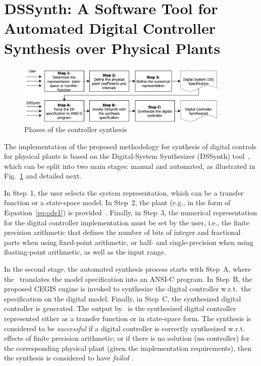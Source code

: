 \fi

\section{DSSynth: A Software Tool for Automated Digital Controller Synthesis over Physical Plants}
\label{sec:dssynthtool}

\begin{figure}[t]
\centering
\includegraphics[width=0.9\textwidth]{figures/synthesis-flow.pdf}
\caption{Phases of the controller synthesis}
\label{fig:synthesis-flow}
\end{figure}

The implementation of the proposed methodology for synthesis of digital controls for physical plants is based on the Digital-System Synthesizer 
(DSSynth) tool~\cite{DBLP:conf/kbse/AbateBCCCDKKP17}, 
which can be split into two main stages: manual and automated, as illustrated in Fig.~\ref{fig:synthesis-flow} and detailed next. 

In Step~1, the user selects the system representation, which can be a transfer function or a state-space model.  
In Step~2, the plant (e.g., in the form of Equation~\eqref{eq:ode1}) is provided~\cite{astrom1997computer}.  
Finally, in Step~3, the numerical representation for the digital controller implementation must be set by the user, i.e., 
the finite precision arithmetic that defines the number of bits of integer and fractional parts when using fixed-point arithmetic, 
or half- and single-precision when using floating-point arithmetic, 
as well as the input range.  

In the second stage, 
the automated synthesis process starts with Step~A, where the
\tool~translates the model specification into an ANSI-C program.  
In Step~B, the proposed CEGIS engine is invoked to synthesize the digital controller w.r.t.~the specification on the digital model.  
Finally, in Step~C, the synthesized digital controller is generated.  
The output by \tool~is the synthesized digital controller represented either as a transfer function or in state-space form.  
The synthesis is considered to be \emph{successful} if a digital controller is
correctly synthesized w.r.t. effects of finite precision arithmetic; or if there is no solution (no
controller) for the corresponding physical plant (given the implementation
requirements), then the synthesis is considered to have \emph{failed} .

